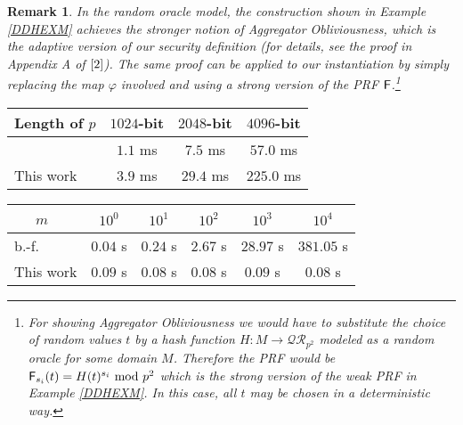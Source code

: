 \documentclass[10pt]{extarticle}
\newtheorem{Rem}{Remark}
\begin{document}
\begin{Rem} In the random oracle model, the construction shown in Example \ref{DDHEXM} achieves the stronger notion of Aggregator Obliviousness, which is the adaptive version of our security definition (for details, see the proof in Appendix A of $\cite {2}$). The same proof can be applied to our instantiation by simply replacing the map $\varphi$ involved and using a strong version of the PRF $\text{\upshape\sffamily F}$.\footnote{For showing Aggregator Obliviousness we would have to substitute the choice of random values $t$ by a hash function $H:M\to\mathcal{QR}_{p^2}$ modeled as a random oracle for some domain $M$. Therefore the PRF would be $\text{\upshape\sffamily F}_{s_i}(t)=H(t)^{s_i}\mbox{ mod } p^2$ which is the strong version of the weak PRF in Example \ref{DDHEXM}. In this case, all $t$ may be chosen in a deterministic way.}
\end{Rem}


\begin{table}[t]
\centering
\begin{tabular}{l||c|c|c} Length of $p$ & $1024$-bit & $2048$-bit & $4096$-bit\\ \hline \cite{2} & $1.1$ ms & $7.5$ ms & $57.0$ ms\\ This work & $3.9$ ms & $29.4$ ms & $225.0$ ms
\end{tabular}
\label{enctab}
\end{table}

\begin{table}[t]
\centering
\begin{tabular}{l||c|c|c|c|c} \,\,\,\,\,\,\,\,\,$m$ & $10^0$ & $10^1$ & $10^2$ & $10^3$ & $10^4$\\ \hline \cite{2} b.-f. & $0.04$ s & $0.24$ s & $2.67$ s & $28.97$ s & $381.05$ s\\ This work & $0.09$ s & $0.08$ s & $0.08$ s & $0.09$ s & $0.08$ s
\end{tabular}
\label{dectab}
\end{table}
\end{document}
